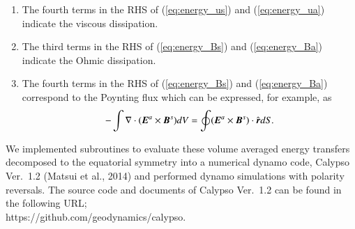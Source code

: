 {\begin{enumerate}
\item 
The fourth terms in the RHS of (\ref{eq:energy_us}) and (\ref{eq:energy_ua}) indicate the viscous dissipation.

\item 
The third terms in the RHS of (\ref{eq:energy_Bs}) and (\ref{eq:energy_Ba}) indicate the Ohmic dissipation.

\item 
The fourth terms in the RHS of (\ref{eq:energy_Bs}) and (\ref{eq:energy_Ba}) correspond to the Poynting flux which can be expressed, for example, as
\begin{equation}
-\int \nabla \cdot
  ( \mbox{\boldmath$E$}^a \times \mbox{\boldmath$B$}^s ) d V =
 \oint (\mbox{\boldmath$E$}^a \times \mbox{\boldmath$B$}^s )
   \cdot \hat{\mbox{\boldmath$r$}} d S .
\label{eq:Poynting}
\end{equation}
\end{enumerate}
}
%
%

We implemented subroutines to evaluate these volume averaged energy transfers decomposed to the equatorial symmetry into a numerical dynamo code, Calypso Ver.~1.2 (Matsui et al., 2014) 
and performed dynamo simulations with polarity reversals.
%
The source code and documents of Calypso Ver.~1.2 can be found in the following URL;\\
https://github.com/geodynamics/calypso.\\

